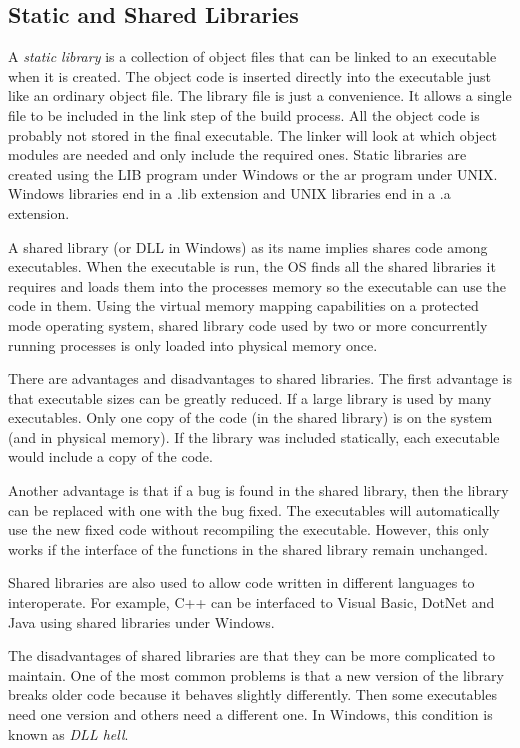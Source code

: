 \subsection{Static and Shared Libraries}

A \emph{static library} is a collection of object files that can be
linked to an executable when it is created. The object code is
inserted directly into the executable just like an ordinary object
file. The library file is just a convenience. It allows a single file
to be included in the link step of the build process. All the object
code is probably not stored in the final executable. The linker will
look at which object modules are needed and only include the required
ones. Static libraries are created using the {\code LIB} program under
Windows or the {\code ar} program under UNIX. Windows libraries end in
a {\code .lib} extension and UNIX libraries end in a {\code .a}
extension.

A shared library (or DLL in Windows) as its name implies shares code
among executables. When the executable is run, the OS finds all the 
shared libraries it requires and loads them into the processes memory
so the executable can use the code in them. Using the virtual memory
mapping capabilities on a protected mode operating system, shared
library code used by two or more concurrently running processes is
only loaded into physical memory once. 

There are advantages and disadvantages to shared libraries. The first
advantage is that executable sizes can be greatly reduced. If a large
library is used by many executables. Only one copy of the code (in the
shared library) is on the system (and in physical memory). If the
library was included statically, each executable would include a copy
of the code.

Another advantage is that if a bug is found in the shared library,
then the library can be replaced with one with the bug fixed. The
executables will automatically use the new fixed code without
recompiling the executable. However, this only works if the interface
of the functions in the shared library remain unchanged.

Shared libraries are also used to allow code written in different
languages to interoperate. For example, C++ can be interfaced to
Visual Basic, DotNet and
Java using shared libraries under Windows.

The disadvantages of shared libraries are that they can be more complicated
to maintain. One of the most common problems is that a new version of the
library breaks older code because it behaves slightly differently. Then
some executables need one version and others need a different one. In Windows,
this condition is known as \emph{DLL hell}.


